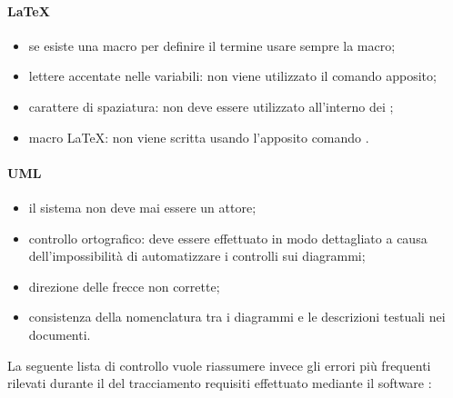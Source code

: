 \documentclass[12pt,a4paper]{article}
\begin{document}
\paragraph{LaTeX}
\begin{itemize}
	\item se esiste una macro per definire il termine usare sempre la macro;
	\item lettere accentate nelle variabili: non viene utilizzato il comando apposito; 
	\item carattere di spaziatura: non deve essere utilizzato all'interno dei ; 
	\item macro \LaTeX{}: non viene scritta usando l’apposito comando . 
\end{itemize}


\paragraph{UML}
\begin{itemize}
	\item il sistema non deve mai essere un attore; 
	\item controllo ortografico: deve essere effettuato in modo dettagliato a causa dell'impossibilità di automatizzare i controlli sui diagrammi; 
	\item direzione delle frecce non corrette; 
	\item consistenza della nomenclatura tra i diagrammi e le descrizioni testuali nei documenti. 
\end{itemize}

La seguente lista di controllo vuole riassumere invece gli  errori più frequenti rilevati durante il  del tracciamento requisiti effettuato mediante il software :
\end{document}
